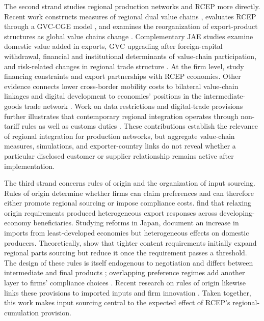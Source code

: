 \documentclass[preprint,12pt,authoryear]{elsarticle}
\begin{document}
The second strand studies regional production networks and RCEP more directly. Recent work constructs measures of regional dual value chains \citep{he2023regional}, evaluates RCEP through a GVC-CGE model \citep{sun2023estimating}, and examines the reorganization of export-product structures as global value chains change \citep{zhang2024restructuring}. Complementary JAE studies examine domestic value added in exports, GVC upgrading after foreign-capital withdrawal, financial and institutional determinants of value-chain participation, and risk-related changes in regional trade structure \citep{du2023higher,wu2023gvc,xu2024financial,ali2026governance,liu2026risks}. At the firm level, \citet{peng2025financing} study financing constraints and export partnerships with RCEP economies. Other evidence connects lower cross-border mobility costs to bilateral value-chain linkages \citep{ma2024mobility} and digital development to economies' positions in the intermediate-goods trade network \citep{huang2026intermediate}. Work on data restrictions and digital-trade provisions further illustrates that contemporary regional integration operates through non-tariff rules as well as customs duties \citep{ma2024data,li2026digitalrules}. These contributions establish the relevance of regional integration for production networks, but aggregate value-chain measures, simulations, and exporter-country links do not reveal whether a particular disclosed customer or supplier relationship remains active after implementation.

The third strand concerns rules of origin and the organization of input sourcing. Rules of origin determine whether firms can claim preferences and can therefore either promote regional sourcing or impose compliance costs. \citet{tanaka2022rooexports} find that relaxing origin requirements produced heterogeneous export responses across developing-economy beneficiaries. Studying reforms in Japan, \citet{hayakawa2023reform} document an increase in imports from least-developed economies but heterogeneous effects on domestic producers. Theoretically, \citet{head2024laffer} show that tighter content requirements initially expand regional parts sourcing but reduce it once the requirement passes a threshold. The design of these rules is itself endogenous to negotiation and differs between intermediate and final products \citep{hayakawa2024negotiating}; overlapping preference regimes add another layer to firms' compliance choices \citep{hayakawa2022multiple}. Recent research on rules of origin likewise links these provisions to imported inputs and firm innovation \citep{zhou2025origin}. Taken together, this work makes input sourcing central to the expected effect of RCEP's regional-cumulation provision.
\end{document}
